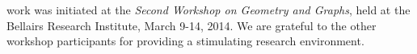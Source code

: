 \documentclass[11pt]{patmorin}
\begin{document}
work was initiated at the \emph{Second Workshop on Geometry and Graphs},
held at the Bellairs Research Institute, March 9-14, 2014.  We are
grateful to the other workshop participants for providing a stimulating
research environment.





\end{document}
